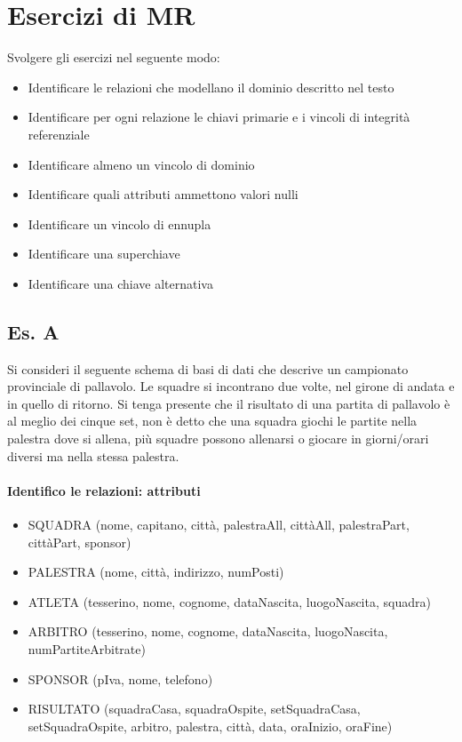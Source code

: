 \chapter{Esercizi di MR}
Svolgere gli esercizi nel seguente modo:
\begin{itemize}
    \item Identificare le relazioni che modellano il dominio descritto nel testo
    \item Identificare per ogni relazione le chiavi primarie e i vincoli di integrità referenziale
    \item Identificare almeno un vincolo di dominio
    \item Identificare quali attributi ammettono valori nulli
    \item Identificare un vincolo di ennupla
    \item Identificare una superchiave
    \item Identificare una chiave alternativa
\end{itemize}

\section{Es. A}
Si consideri il seguente schema di basi di dati che descrive un campionato provinciale di pallavolo. Le squadre si incontrano due volte, nel girone di andata e in quello di ritorno. Si tenga presente che il risultato di una partita di pallavolo è al meglio dei cinque set, non è detto che una squadra giochi le partite nella palestra dove si allena, più squadre possono allenarsi o giocare in giorni/orari diversi ma nella stessa palestra. 

\subsubsection{Identifico le relazioni: attributi}
\begin{itemize}
    \item SQUADRA (nome, capitano, città, palestraAll, cittàAll, palestraPart, cittàPart, sponsor)
    \item PALESTRA (nome, città, indirizzo, numPosti)
    \item ATLETA (tesserino, nome, cognome, dataNascita, luogoNascita, squadra)
    \item ARBITRO (tesserino, nome, cognome, dataNascita, luogoNascita, numPartiteArbitrate)
    \item SPONSOR (pIva, nome, telefono)
    \item RISULTATO (squadraCasa, squadraOspite, setSquadraCasa, setSquadraOspite, arbitro, palestra, città, data, oraInizio, oraFine)
\end{itemize}

